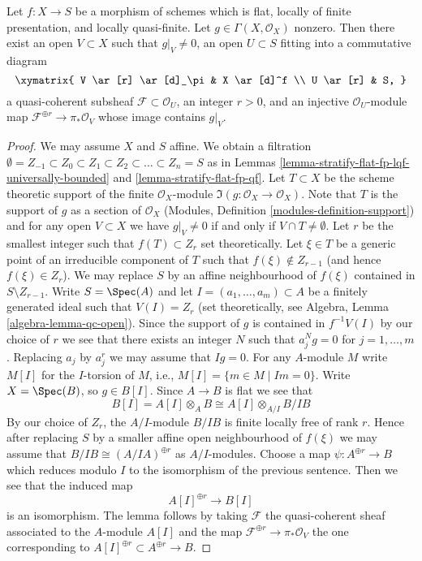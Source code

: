 \begin{lemma}
\label{lemma-go-down-with-annihilators}
Let $f : X \to S$ be a morphism of schemes which is flat, locally of
finite presentation, and locally quasi-finite. Let
$g \in \Gamma(X, \mathcal{O}_X)$ nonzero. Then there exist
an open $V \subset X$ such that $g|_V \not = 0$, an open
$U \subset S$ fitting into a commutative diagram
$$
\xymatrix{
V \ar[r] \ar[d]_\pi & X \ar[d]^f \\
U \ar[r] & S,
}
$$
a quasi-coherent subsheaf $\mathcal{F} \subset \mathcal{O}_U$, an integer
$r > 0$, and an injective $\mathcal{O}_U$-module map
$\mathcal{F}^{\oplus r} \to \pi_*\mathcal{O}_V$
whose image contains $g|_V$.
\end{lemma}

\begin{proof}
We may assume $X$ and $S$ affine. We obtain a filtration
$\emptyset = Z_{-1} \subset Z_0 \subset Z_1 \subset Z_2 \subset \ldots
\subset Z_n = S$ as in
Lemmas \ref{lemma-stratify-flat-fp-lqf-universally-bounded} and
\ref{lemma-stratify-flat-fp-qf}.
Let $T \subset X$ be the scheme theoretic support of the finite
$\mathcal{O}_X$-module $\Im(g : \mathcal{O}_X \to \mathcal{O}_X)$.
Note that $T$ is the support of $g$ as a section of $\mathcal{O}_X$
(Modules, Definition \ref{modules-definition-support}) and
for any open $V \subset X$ we have $g|_V \not = 0$ if and only if
$V \cap T \not = \emptyset$.
Let $r$ be the smallest integer such that $f(T) \subset Z_r$
set theoretically. Let $\xi \in T$ be a generic point of an irreducible
component of $T$ such that $f(\xi) \not \in Z_{r - 1}$ (and hence
$f(\xi) \in Z_r$). We may replace $S$ by an affine neighbourhood of
$f(\xi)$ contained in $S \setminus Z_{r - 1}$. Write $S = \Spec(A)$
and let $I = (a_1, \ldots, a_m) \subset A$ be a finitely generated ideal
such that $V(I) = Z_r$ (set theoretically, see
Algebra, Lemma \ref{algebra-lemma-qc-open}).
Since the support of $g$ is contained in $f^{-1}V(I)$ by our choice of $r$
we see that there exists an integer $N$ such that
$a_j^N g = 0$ for $j = 1, \ldots, m$. Replacing $a_j$ by $a_j^r$
we may assume that $Ig = 0$. For any $A$-module $M$ write
$M[I]$ for the $I$-torsion of $M$, i.e., $M[I] = \{m \in M \mid Im = 0\}$.
Write $X = \Spec(B)$, so $g \in B[I]$. Since $A \to B$ is flat we
see that
$$
B[I] = A[I] \otimes_A B \cong A[I] \otimes_{A/I} B/IB
$$
By our choice of $Z_r$, the $A/I$-module $B/IB$ is
finite locally free of rank $r$. Hence after replacing $S$ by
a smaller affine open neighbourhood of $f(\xi)$ we may assume
that $B/IB \cong (A/IA)^{\oplus r}$ as $A/I$-modules.
Choose a map $\psi : A^{\oplus r} \to B$ which reduces modulo $I$ to the
isomorphism of the previous sentence. Then we see that
the induced map
$$
A[I]^{\oplus r} \longrightarrow B[I]
$$
is an isomorphism. The lemma follows by taking $\mathcal{F}$ the
quasi-coherent sheaf associated to the $A$-module $A[I]$ and
the map $\mathcal{F}^{\oplus r} \to \pi_*\mathcal{O}_V$ the
one corresponding to $A[I]^{\oplus r} \subset A^{\oplus r} \to B$.
\end{proof}

